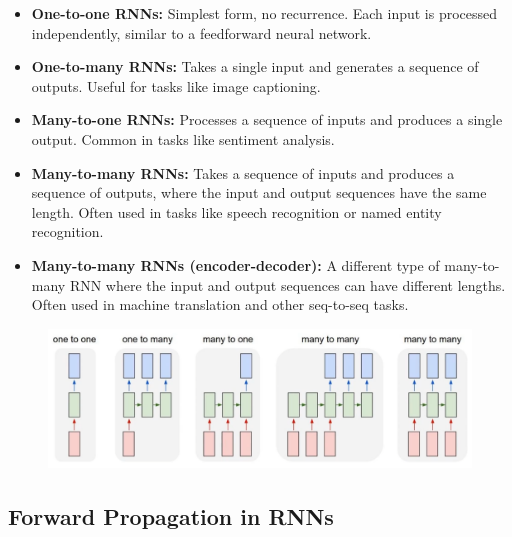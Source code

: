 \begin{itemize}
  \item \textbf{One-to-one RNNs:} Simplest form, no recurrence. Each input is processed independently, similar to a feedforward neural network.
  \item \textbf{One-to-many RNNs:} Takes a single input and generates a sequence of outputs. Useful for tasks like image captioning.
  \item \textbf{Many-to-one RNNs:} Processes a sequence of inputs and produces a single output. Common in tasks like sentiment analysis.
  \item \textbf{Many-to-many RNNs:} Takes a sequence of inputs and produces a sequence of outputs, where the input and output sequences have the same length. Often used in tasks like speech recognition or named entity recognition.
  \item \textbf{Many-to-many RNNs (encoder-decoder):} A different type of many-to-many RNN where the input and output sequences can have different lengths. Often used in machine translation and other seq-to-seq tasks.
\end{itemize}

\begin{figure}[H]
  \includegraphics[width=\linewidth]{images/types_of_rnns.png}
\end{figure}

\subsection*{Forward Propagation in RNNs}

